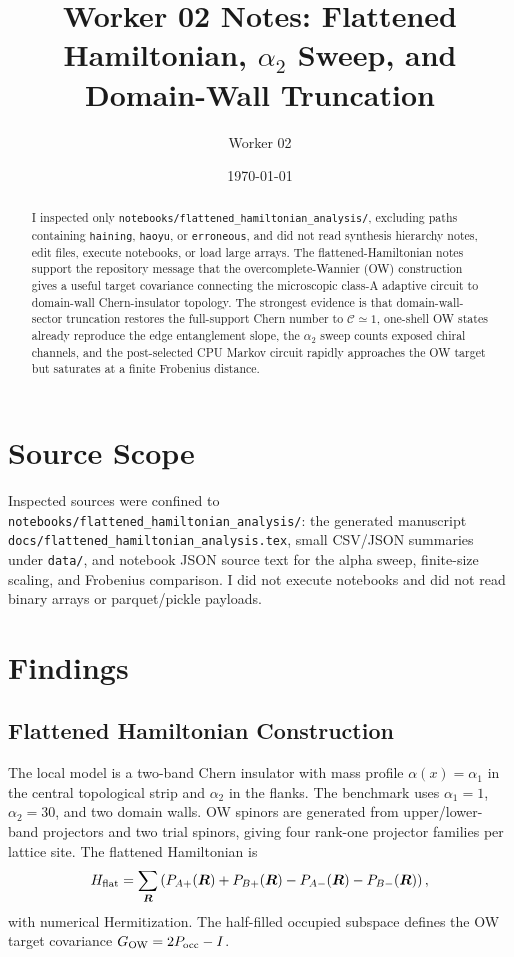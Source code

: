 \documentclass[aps,prb,onecolumn,nofootinbib,superscriptaddress]{revtex4-2}
\begin{document}
\title{Worker 02 Notes: Flattened Hamiltonian, \texorpdfstring{$\alpha_2$}{alpha2} Sweep, and Domain-Wall Truncation}
\author{Worker 02}
\date{\today}

\begin{abstract}
I inspected only \texttt{notebooks/flattened\_hamiltonian\_analysis/}, excluding paths containing \texttt{haining}, \texttt{haoyu}, or \texttt{erroneous}, and did not read synthesis hierarchy notes, edit files, execute notebooks, or load large arrays. The flattened-Hamiltonian notes support the repository message that the overcomplete-Wannier (OW) construction gives a useful target covariance connecting the microscopic class-A adaptive circuit to domain-wall Chern-insulator topology. The strongest evidence is that domain-wall-sector truncation restores the full-support Chern number to $\mathcal C\simeq1$, one-shell OW states already reproduce the edge entanglement slope, the $\alpha_2$ sweep counts exposed chiral channels, and the post-selected CPU Markov circuit rapidly approaches the OW target but saturates at a finite Frobenius distance.
\end{abstract}

\maketitle
\setcounter{tocdepth}{2}
\tableofcontents

\section{Source Scope}

Inspected sources were confined to \texttt{notebooks/flattened\_hamiltonian\_analysis/}: the generated manuscript \texttt{docs/flattened\_hamiltonian\_analysis.tex}, small CSV/JSON summaries under \texttt{data/}, and notebook JSON source text for the alpha sweep, finite-size scaling, and Frobenius comparison. I did not execute notebooks and did not read binary arrays or parquet/pickle payloads.

\section{Findings}

\subsection{Flattened Hamiltonian Construction}

The local model is a two-band Chern insulator with mass profile $\alpha(x)=\alpha_1$ in the central topological strip and $\alpha_2$ in the flanks. The benchmark uses $\alpha_1=1$, $\alpha_2=30$, and two domain walls. OW spinors are generated from upper/lower-band projectors and two trial spinors, giving four rank-one projector families per lattice site. The flattened Hamiltonian is
\begin{equation}
H_{\rm flat}=\sum_{\bm R}\left(P_{A+}(\bm R)+P_{B+}(\bm R)-P_{A-}(\bm R)-P_{B-}(\bm R)\right),
\end{equation}
with numerical Hermitization. The half-filled occupied subspace defines the OW target covariance $G_{\rm OW}=2P_{\rm occ}-I$.
\end{document}

